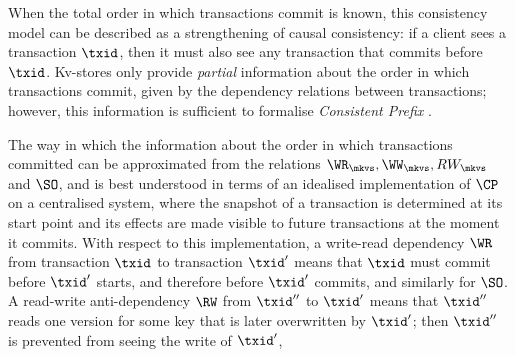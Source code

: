 \label{para:cp}
When the total order in which transactions commit is known, this consistency model 
can be described as a strengthening of causal consistency: 
if a client sees a transaction $\txid$,
then it must also see any transaction that commits before $\txid$. 
Kv-stores only provide {\em partial} information about the order in which transactions commit, 
given by the dependency relations between transactions; however, 
this information is sufficient to formalise \emph{Consistent Prefix} \cite{laws}.

The way in which the information about the order in which transactions 
committed can be approximated from the relations $\WR_{\mkvs}, \WW_{\mkvs}, 
RW_{\mkvs}$ and $\SO$, and is best understood in terms of an idealised implementation of 
$\CP$ on a centralised system,
where the snapshot of a transaction is determined at its start point and its effects are made visible 
to future transactions at the moment it commits. 
With respect to this implementation, a write-read dependency \(\WR\) from transaction $\txid$ to transaction $\txid'$ 
means that 
$\txid$ {must} commit before $\txid'$ starts, and therefore before $\txid'$ commits,
and similarly for $\SO$.
% 
A read-write anti-dependency \(\RW\) from $\txid''$ to $\txid'$ 
means that $\txid''$ reads one version for some key that 
is later overwritten by $\txid'$; then $\txid''$ is prevented from seeing the write of $\txid'$, 

